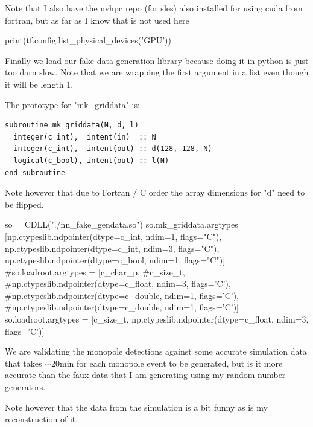 \documentclass[10pt, a4paper]{article}
\begin{document}
Note that I also have the nvhpc repo (for sles) also installed for using cuda from fortran, but as far as I know that is not used here 

\begin{code}
print(tf.config.list_physical_devices('GPU'))
\end{code}

Finally we load our fake data generation library because doing it in python is just too darn slow. 
Note that we are wrapping the first argument in a list even though it will be length 1.

The prototype for "mk_griddata" is:

\begin{verbatim}
subroutine mk_griddata(N, d, l)
  integer(c_int),  intent(in)  :: N 
  integer(c_int),  intent(out) :: d(128, 128, N)
  logical(c_bool), intent(out) :: l(N)
end subroutine
\end{verbatim}

Note however that due to Fortran / C order the array dimensions for "d" need to be flipped. 

\begin{code}
so = CDLL("./nn_fake_gendata.so")
so.mk_griddata.argtypes = [np.ctypeslib.ndpointer(dtype=c_int,  ndim=1, flags="C"),
                           np.ctypeslib.ndpointer(dtype=c_int,  ndim=3, flags="C"),
                           np.ctypeslib.ndpointer(dtype=c_bool, ndim=1, flags="C")]
#so.loadroot.argtypes    = [c_char_p,
                           #c_size_t,
                           #np.ctypeslib.ndpointer(dtype=c_float, ndim=3, flags='C'),
                           #np.ctypeslib.ndpointer(dtype=c_double, ndim=1, flags='C'),
                           #np.ctypeslib.ndpointer(dtype=c_double, ndim=1, flags='C')]
so.loadroot.argtypes    = [c_size_t,
                           np.ctypeslib.ndpointer(dtype=c_float, ndim=3, flags='C')]
\end{code}

We are validating the monopole detections against some accurate simulation data that takes $\sim20$\si{\minute} for each monopole event to be generated, but is it more accurate than the faux data that I am generating using my random number generators. 

Note however that the data from the simulation is a bit funny as is my reconstruction of it. 
\end{document}
